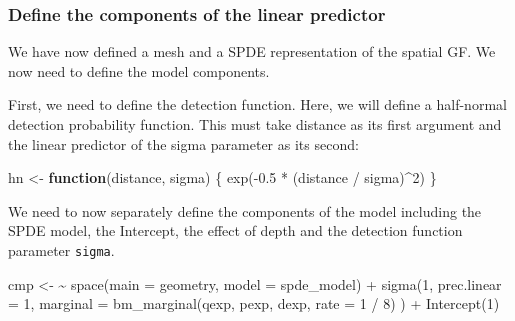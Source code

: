 \documentclass[
  letterpaper,
  DIV=11,
  numbers=noendperiod]{scrartcl}
\newenvironment{Shaded}{\begin{snugshade}}{\end{snugshade}}
\newcommand{\AttributeTok}[1]{\textcolor[rgb]{0.40,0.45,0.13}{#1}}
\newcommand{\ControlFlowTok}[1]{\textcolor[rgb]{0.00,0.23,0.31}{\textbf{#1}}}
\newcommand{\DecValTok}[1]{\textcolor[rgb]{0.68,0.00,0.00}{#1}}
\newcommand{\ErrorTok}[1]{\textcolor[rgb]{0.68,0.00,0.00}{#1}}
\newcommand{\FloatTok}[1]{\textcolor[rgb]{0.68,0.00,0.00}{#1}}
\newcommand{\FunctionTok}[1]{\textcolor[rgb]{0.28,0.35,0.67}{#1}}
\newcommand{\NormalTok}[1]{\textcolor[rgb]{0.00,0.23,0.31}{#1}}
\newcommand{\OtherTok}[1]{\textcolor[rgb]{0.00,0.23,0.31}{#1}}
\newcommand{\SpecialCharTok}[1]{\textcolor[rgb]{0.37,0.37,0.37}{#1}}
\begin{document}
\begin{tcolorbox}
\end{tcolorbox}

\subsubsection{Define the components of the linear
predictor}\label{define-the-components-of-the-linear-predictor}

We have now defined a mesh and a SPDE representation of the spatial GF.
We now need to define the model components.

First, we need to define the detection function. Here, we will define a
half-normal detection probability function. This must take distance as
its first argument and the linear predictor of the sigma parameter as
its second:

\begin{Shaded}
\begin{Highlighting}[]
\NormalTok{hn }\OtherTok{\textless{}{-}} \ControlFlowTok{function}\NormalTok{(distance, sigma) \{}
  \FunctionTok{exp}\NormalTok{(}\SpecialCharTok{{-}}\FloatTok{0.5} \SpecialCharTok{*}\NormalTok{ (distance }\SpecialCharTok{/}\NormalTok{ sigma)}\SpecialCharTok{\^{}}\DecValTok{2}\NormalTok{)}
\NormalTok{\}}
\end{Highlighting}
\end{Shaded}

We need to now separately define the components of the model including
the SPDE model, the Intercept, the effect of depth and the detection
function parameter \texttt{sigma}.

\begin{Shaded}
\begin{Highlighting}[]
\NormalTok{cmp }\OtherTok{\textless{}{-}} \ErrorTok{\textasciitilde{}} \FunctionTok{space}\NormalTok{(}\AttributeTok{main =}\NormalTok{ geometry, }\AttributeTok{model =}\NormalTok{ spde\_model) }\SpecialCharTok{+}
  \FunctionTok{sigma}\NormalTok{(}\DecValTok{1}\NormalTok{,}
    \AttributeTok{prec.linear =} \DecValTok{1}\NormalTok{,}
    \AttributeTok{marginal =} \FunctionTok{bm\_marginal}\NormalTok{(qexp, pexp, dexp, }\AttributeTok{rate =} \DecValTok{1} \SpecialCharTok{/} \DecValTok{8}\NormalTok{)}
\NormalTok{  ) }\SpecialCharTok{+}
  \FunctionTok{Intercept}\NormalTok{(}\DecValTok{1}\NormalTok{)}
\end{Highlighting}
\end{Shaded}
\end{document}
